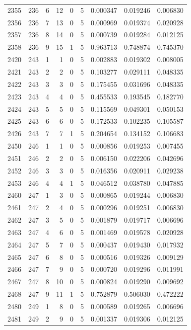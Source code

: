 \begin{longtable}{rrrrrrrrr}
2355 & 236 & 6 & 12 & 0 & 5 & 0.000347 & 0.019246 & 0.006830 \\
2356 & 236 & 7 & 13 & 0 & 5 & 0.000969 & 0.019374 & 0.020928 \\
2357 & 236 & 8 & 14 & 0 & 5 & 0.000739 & 0.019284 & 0.012125 \\
2358 & 236 & 9 & 15 & 1 & 5 & 0.963713 & 0.748874 & 0.745370 \\
2420 & 243 & 1 & 1 & 0 & 5 & 0.002883 & 0.019302 & 0.008005 \\
2421 & 243 & 2 & 2 & 0 & 5 & 0.103277 & 0.029111 & 0.048335 \\
2422 & 243 & 3 & 3 & 0 & 5 & 0.175455 & 0.031696 & 0.048335 \\
2423 & 243 & 4 & 4 & 0 & 5 & 0.455533 & 0.193545 & 0.182770 \\
2424 & 243 & 5 & 5 & 0 & 5 & 0.115569 & 0.049301 & 0.050153 \\
2425 & 243 & 6 & 6 & 0 & 5 & 0.172533 & 0.102235 & 0.105587 \\
2426 & 243 & 7 & 7 & 1 & 5 & 0.204654 & 0.134152 & 0.106683 \\
2450 & 246 & 1 & 1 & 0 & 5 & 0.000856 & 0.019253 & 0.007455 \\
2451 & 246 & 2 & 2 & 0 & 5 & 0.006150 & 0.022206 & 0.042696 \\
2452 & 246 & 3 & 3 & 0 & 5 & 0.016356 & 0.020911 & 0.029238 \\
2453 & 246 & 4 & 4 & 1 & 5 & 0.046512 & 0.038780 & 0.047885 \\
2460 & 247 & 1 & 3 & 0 & 5 & 0.000865 & 0.019244 & 0.006830 \\
2461 & 247 & 2 & 4 & 0 & 5 & 0.000296 & 0.019251 & 0.006830 \\
2462 & 247 & 3 & 5 & 0 & 5 & 0.001879 & 0.019717 & 0.006696 \\
2463 & 247 & 4 & 6 & 0 & 5 & 0.001469 & 0.019578 & 0.020928 \\
2464 & 247 & 5 & 7 & 0 & 5 & 0.000437 & 0.019430 & 0.017932 \\
2465 & 247 & 6 & 8 & 0 & 5 & 0.000516 & 0.019326 & 0.009129 \\
2466 & 247 & 7 & 9 & 0 & 5 & 0.000720 & 0.019296 & 0.011991 \\
2467 & 247 & 8 & 10 & 0 & 5 & 0.000824 & 0.019290 & 0.009692 \\
2468 & 247 & 9 & 11 & 1 & 5 & 0.752879 & 0.506030 & 0.472222 \\
2480 & 249 & 1 & 8 & 0 & 5 & 0.000589 & 0.019265 & 0.006696 \\
2481 & 249 & 2 & 9 & 0 & 5 & 0.001337 & 0.019306 & 0.012125 \\

\end{longtable}
